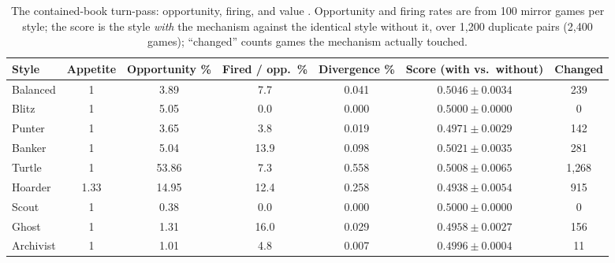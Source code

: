 \documentclass[11pt]{article}
\begin{document}
\begin{table}[t]
\centering
\caption{The contained-book turn-pass: opportunity, firing, and value \cite{styles}.
Opportunity and firing rates are from 100 mirror games per style; the score is the style
\emph{with} the mechanism against the identical style without it, over 1{,}200 duplicate
pairs (2{,}400 games); ``changed'' counts games the mechanism actually touched.}
\label{tab:contained}
\footnotesize
\begin{tabular}{@{}lcccccc@{}}
\toprule
Style & Appetite & Opportunity \% & Fired / opp.\ \% & Divergence \% & Score (with vs.\ without) & Changed \\
\midrule
Balanced  & 1    & 3.89  & 7.7  & 0.041 & $0.5046 \pm 0.0034$ & 239 \\
Blitz     & 1    & 5.05  & 0.0  & 0.000 & $0.5000 \pm 0.0000$ & 0 \\
Punter    & 1    & 3.65  & 3.8  & 0.019 & $0.4971 \pm 0.0029$ & 142 \\
Banker    & 1    & 5.04  & 13.9 & 0.098 & $0.5021 \pm 0.0035$ & 281 \\
Turtle    & 1    & 53.86 & 7.3  & 0.558 & $0.5008 \pm 0.0065$ & 1{,}268 \\
Hoarder   & 1.33 & 14.95 & 12.4 & 0.258 & $0.4938 \pm 0.0054$ & 915 \\
Scout     & 1    & 0.38  & 0.0  & 0.000 & $0.5000 \pm 0.0000$ & 0 \\
Ghost     & 1    & 1.31  & 16.0 & 0.029 & $0.4958 \pm 0.0027$ & 156 \\
Archivist & 1    & 1.01  & 4.8  & 0.007 & $0.4996 \pm 0.0004$ & 11 \\
\bottomrule
\end{tabular}
\end{table}
\end{document}
